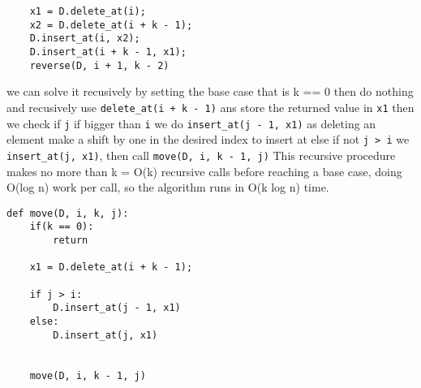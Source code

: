 \documentclass[12pt,twoside]{article}
\begin{document}
\begin{problems}
\begin{problemparts}
\begin{lstlisting}
    x1 = D.delete_at(i);
    x2 = D.delete_at(i + k - 1);
    D.insert_at(i, x2);
    D.insert_at(i + k - 1, x1);
    reverse(D, i + 1, k - 2)

\end{lstlisting}


\problempart %
  we can solve it recusively by setting the base case that is k == 0 then do nothing and recusively use 
  {\tt delete\_at(i + k - 1)} ans store the returned value in {\tt x1} then we check if {\tt j} if bigger 
  than {\tt i} we do {\tt insert\_at(j - 1, x1)} as deleting an element make a shift by one in the desired 
  index to insert at else if not {\tt j > i} we {\tt insert\_at(j, x1)}, then call {\tt move(D, i, k - 1, j)}
  This recursive procedure makes no more than k = O(k) recursive calls before reaching a base case,
  doing O(log n) work per call, so the algorithm runs in O(k log n) time. 
 
 \begin{lstlisting}
def move(D, i, k, j):
    if(k == 0):
        return

    x1 = D.delete_at(i + k - 1);

    if j > i:
        D.insert_at(j - 1, x1)
    else:
        D.insert_at(j, x1)


    move(D, i, k - 1, j)
\end{lstlisting}
\end{problemparts}

\newpage
\problem  %

\problem  %


\end{problems}
\end{document}
